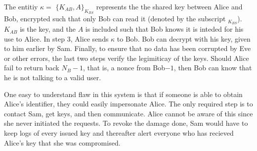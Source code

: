 The entitiy $\kappa = $ $\{K_{AB}, A\}_{K_{BS}}$ represents the the shared key 
between Alice and Bob, encrypted such that only Bob can read it (denoted by the
subscript $_{K_{BS}}$).
$K_{AB}$ is the key, and the $A$ is included such that Bob knows it is 
inteded for his use to Alice.
In step 3, Alice sends $\kappa$ to Bob. Bob can decrypt with his key, given
to him earlier by Sam. Finally, to ensure that no data has been corrupted
by Eve or other errors, the last two steps verify the legimiticay of the keys.
Should Alice fail to return back $N_{B} - 1$, that is, a nonce from Bob$ - 1$,
then Bob can know that he is not talking to a valid user.

One easy to understand flaw in this system is that if someone is able 
to obtain Alice's identifier, they could easily impersonate Alice. 
The only required step is to contact Sam, get keys, and then communicate.
Alice cannot be aware of this since she never initiated the requests.
To revoke the damage done, Sam would have to keep logs of every issued key
and thereafter alert everyone who has recieved Alice's key that she 
was compromised.


